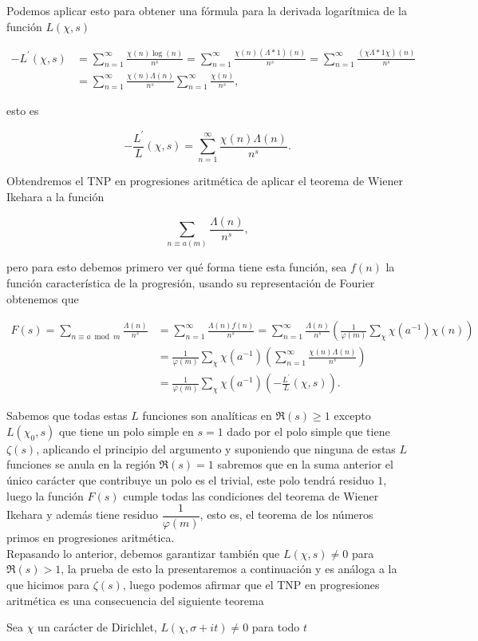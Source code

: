 Podemos aplicar esto para obtener una fórmula para la derivada logarítmica de la función $L(\chi,s)$

\begin{align*}
    -L^{\prime}(\chi,s)&=\sum_{n=1}^{\infty} \frac{\chi(n)\log(n)}{n^s}=\sum_{n=1}^{\infty} \frac{\chi(n)(\Lambda*1)(n)}{n^s}=\sum_{n=1}^{\infty} \frac{(\chi\Lambda*1\chi)(n) }{n^s}\\
    &=\sum_{n=1}^{\infty} \frac{\chi(n)\Lambda(n)}{n^s}\sum_{n=1}^{\infty} \frac{\chi(n)}{n^s},
\end{align*}

esto es

$$\boxed{-\frac{L^{\prime}}{L}(\chi,s)=\sum_{n=1}^{\infty} \frac{\chi(n)\Lambda(n)}{n^s}}.$$

Obtendremos el TNP en progresiones aritmética de aplicar el teorema de Wiener Ikehara a la función

$$\sum_{n\equiv a(m)}\frac{\Lambda(n)}{n^s},$$

pero para esto debemos primero ver qué forma tiene esta función, sea $f(n)$ la función característica de la progresión, usando su representación de Fourier obtenemos que

\begin{align*}
    F(s)=\sum_{n\equiv a\bmod{m}}\frac{\Lambda(n)}{n^s}&=\sum_{n=1}^{\infty}\frac{\Lambda(n)f(n)}{n^s}=\sum_{n=1}^{\infty} \frac{\Lambda(n)}{n^s}\left(\frac{1}{\varphi(m)}\sum_\chi \chi(a^{-1})\chi(n)\right)\\
    &=\frac{1}{\varphi(m)}\sum_\chi\chi(a^{-1})\left(\sum_{n=1}^{\infty} \frac{\chi(n)\Lambda(n)}{n^s}\right)\\
    &=\frac{1}{\varphi(m)}\sum_\chi\chi(a^{-1})\left(-\frac{L^{\prime}}{L}(\chi,s)\right)
.\end{align*}

Sabemos que todas estas $L$ funciones son analíticas en $\Re(s)\geq 1$ excepto $L(\chi_0,s)$ que tiene un polo simple en $s=1$ dado por el polo simple que tiene $\zeta(s)$, aplicando el principio del argumento y suponiendo que ninguna de estas $L$ funciones se anula en la región $\Re(s)=1$ sabremos que en la suma anterior el único carácter que contribuye un polo es el trivial, este polo tendrá residuo $1$, luego la función $F(s)$ cumple todas las condiciones del teorema de Wiener Ikehara y además tiene residuo $\dfrac{1}{\varphi(m)}$, esto es, el teorema de los números primos en progresiones aritmética.\\

Repasando lo anterior, debemos garantizar también que $L(\chi,s)\neq 0$ para $\Re(s)>1$, la prueba de esto la presentaremos a continuación y es análoga a la que hicimos para $\zeta(s)$, luego podemos afirmar que el TNP en progresiones aritmética es una consecuencia del siguiente teorema

\begin{theorem}
    Sea $\chi$ un carácter de Dirichlet, $L(\chi,\sigma+it)\neq 0$  para todo $t$
\end{theorem}


